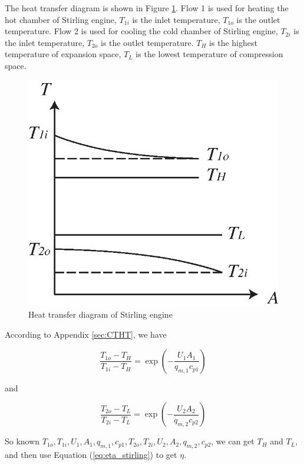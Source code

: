 \documentclass{article}
\begin{document}
The heat transfer diagram is shown in Figure \ref{fig:Heat-transfer-diagram}. Flow 1 is used for heating the hot chamber of Stirling engine, $T_{1i}$ is the inlet temperature, $T_{1o}$ is the outlet temperature. Flow 2 is used for cooling the cold chamber of Stirling engine, $T_{2i}$ is the inlet temperature, $T_{2o}$ is the outlet temperature. $T_{H}$ is the highest temperature of expansion space, $T_{L}$ is the lowest temperature of compression space.

\noindent \begin{center}
\begin{figure}[h]
	\noindent \centering{}\includegraphics[width=0.6\columnwidth]{graphics/StirilingHT}
	\protect\caption{\label{fig:Heat-transfer-diagram}Heat transfer diagram of Stirling
engine}
\end{figure}

\par\end{center}

According to Appendix \ref{sec:CTHT}, we have

\begin{equation*}
	\dfrac{T_{1o}-T_{H}}{T_{1i}-T_{H}}=\exp(-\dfrac{U_{1}A_{1}}{q_{m,1}c{}_{p1}})
\end{equation*}

and

\begin{equation*}
	\dfrac{T_{2o}-T_{L}}{T_{2i}-T_{L}}=\exp(-\dfrac{U_{2}A_{2}}{q_{m,2}c_{p2}})
\end{equation*}

So known $T_{1o},T_{1i},U_{1},A_{1},q_{m,1},c_{p1},T_{2o},T_{2i},U_{2},A_{2},q_{m,2},c_{p2}$, we can get $T_{H}$ and $T_{L}$, and then use Equation (\ref{eq:eta_stirling}) to get $\eta$.
\clearpage
\end{document}

